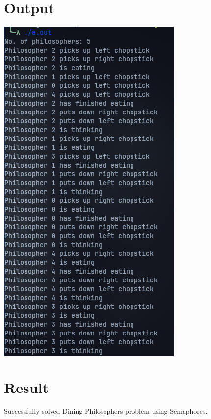 \section{Output}
\includegraphics[width=0.5\linewidth]{Cycle_2//Outputs/philosopher.png}



\section{Result}
Successfully solved Dining Philosophers problem using Semaphores.